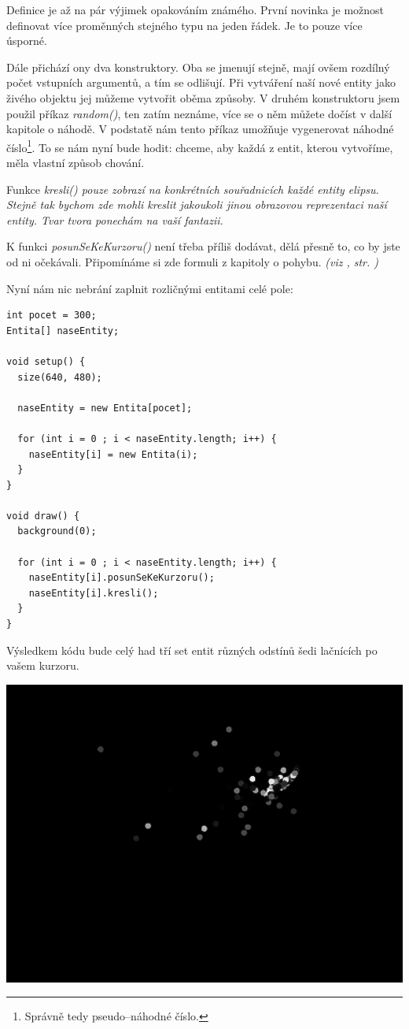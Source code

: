 \documentclass[10pt]{book}
\newcommand{\vyraz}[1]{\textit{\gls{#1}}\index{#1}\label{#1}}
\newcommand{\odkaz}[1]{\textit{(viz \nameref{#1}, str. \pageref*{#1})}}
\begin{document}
Definice je až na pár výjimek opakováním známého. První novinka je možnost definovat více proměnných stejného typu na jeden řádek. Je to pouze více úsporné.

 Dále přichází ony dva konstruktory. Oba se jmenují stejně, mají ovšem rozdílný počet vstupních argumentů, a tím se odlišují. Při vytváření naší nové entity jako živého objektu jej můžeme vytvořit oběma způsoby. V druhém konstruktoru jsem použil příkaz \vyraz{random()}, ten zatím neznáme, více se o něm můžete dočíst v další kapitole o náhodě. V podstatě nám tento příkaz umožňuje vygenerovat náhodné číslo\footnote{Správně tedy pseudo--náhodné číslo.}. To se nám nyní bude hodit: chceme, aby každá z entit, kterou vytvoříme, měla vlastní způsob chování.
 
Funkce \em{kresli()} pouze zobrazí na konkrétních souřadnicích každé entity elipsu. Stejně tak bychom zde mohli kreslit jakoukoli jinou obrazovou reprezentaci naší entity. Tvar tvora ponechám na vaší fantazii.
 
K funkci {\em posunSeKeKurzoru()} není třeba příliš dodávat, dělá přesně to, co by jste od ni očekávali. Připomínáme si zde formuli z kapitoly o pohybu. \odkaz{Dynamika pohybu}

Nyní nám nic nebrání zaplnit rozličnými entitami celé pole:


\begin{lstlisting}
int pocet = 300;
Entita[] naseEntity;

void setup() {
  size(640, 480);

  naseEntity = new Entita[pocet]; 

  for (int i = 0 ; i < naseEntity.length; i++) {
    naseEntity[i] = new Entita(i);
  }
}

void draw() {
  background(0);

  for (int i = 0 ; i < naseEntity.length; i++) {
    naseEntity[i].posunSeKeKurzoru();
    naseEntity[i].kresli();
  }
}
\end{lstlisting}

Výsledkem kódu bude celý had tří set entit různých odstínů šedi lačnících po vašem kurzoru.


\begin{center}
\includegraphics[width = 1\textwidth]{imgs/prace-s-objekty-1.png}
\end{center}
\end{document}
